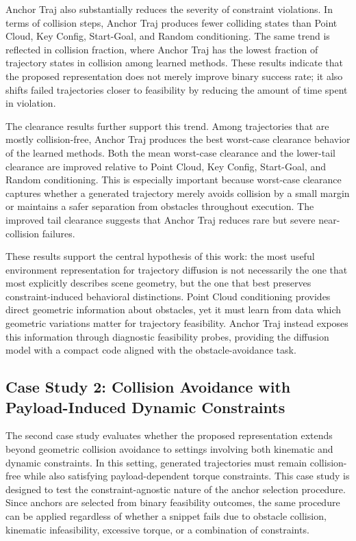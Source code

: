 Anchor Traj also substantially reduces the severity of constraint violations. In terms of collision steps, Anchor Traj produces fewer colliding states than Point Cloud, Key Config, Start-Goal, and Random conditioning. The same trend is reflected in collision fraction, where Anchor Traj has the lowest fraction of trajectory states in collision among learned methods. These results indicate that the proposed representation does not merely improve binary success rate; it also shifts failed trajectories closer to feasibility by reducing the amount of time spent in violation.

The clearance results further support this trend. Among trajectories that are mostly collision-free, Anchor Traj produces the best worst-case clearance behavior of the learned methods. Both the mean worst-case clearance and the lower-tail clearance are improved relative to Point Cloud, Key Config, Start-Goal, and Random conditioning. This is especially important because worst-case clearance captures whether a generated trajectory merely avoids collision by a small margin or maintains a safer separation from obstacles throughout execution. The improved tail clearance suggests that Anchor Traj reduces rare but severe near-collision failures.

These results support the central hypothesis of this work: the most useful environment representation for trajectory diffusion is not necessarily the one that most explicitly describes scene geometry, but the one that best preserves constraint-induced behavioral distinctions. Point Cloud conditioning provides direct geometric information about obstacles, yet it must learn from data which geometric variations matter for trajectory feasibility. Anchor Traj instead exposes this information through diagnostic feasibility probes, providing the diffusion model with a compact code aligned with the obstacle-avoidance task.

\subsection{Case Study 2: Collision Avoidance with Payload-Induced Dynamic Constraints}

The second case study evaluates whether the proposed representation extends beyond geometric collision avoidance to settings involving both kinematic and dynamic constraints. In this setting, generated trajectories must remain collision-free while also satisfying payload-dependent torque constraints. This case study is designed to test the constraint-agnostic nature of the anchor selection procedure. Since anchors are selected from binary feasibility outcomes, the same procedure can be applied regardless of whether a snippet fails due to obstacle collision, kinematic infeasibility, excessive torque, or a combination of constraints.


